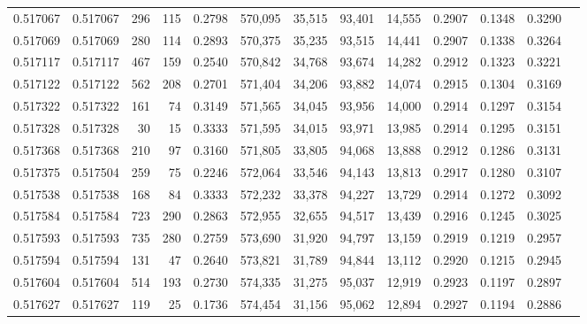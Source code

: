 \begin{tabular}{rrrrrrrrrrrrr}
0.517067 & 0.517067 &   296 &   115 &                                     0.2798 & 570,095 &  35,515 &  93,401 &  14,555 & 0.2907 & 0.1348 & 0.3290 \\
0.517069 & 0.517069 &   280 &   114 &                                     0.2893 & 570,375 &  35,235 &  93,515 &  14,441 & 0.2907 & 0.1338 & 0.3264 \\
0.517117 & 0.517117 &   467 &   159 &                                     0.2540 & 570,842 &  34,768 &  93,674 &  14,282 & 0.2912 & 0.1323 & 0.3221 \\
0.517122 & 0.517122 &   562 &   208 &                                     0.2701 & 571,404 &  34,206 &  93,882 &  14,074 & 0.2915 & 0.1304 & 0.3169 \\
0.517322 & 0.517322 &   161 &    74 &                                     0.3149 & 571,565 &  34,045 &  93,956 &  14,000 & 0.2914 & 0.1297 & 0.3154 \\
0.517328 & 0.517328 &    30 &    15 &                                     0.3333 & 571,595 &  34,015 &  93,971 &  13,985 & 0.2914 & 0.1295 & 0.3151 \\
0.517368 & 0.517368 &   210 &    97 &                                     0.3160 & 571,805 &  33,805 &  94,068 &  13,888 & 0.2912 & 0.1286 & 0.3131 \\
0.517375 & 0.517504 &   259 &    75 &                                     0.2246 & 572,064 &  33,546 &  94,143 &  13,813 & 0.2917 & 0.1280 & 0.3107 \\
0.517538 & 0.517538 &   168 &    84 &                                     0.3333 & 572,232 &  33,378 &  94,227 &  13,729 & 0.2914 & 0.1272 & 0.3092 \\
0.517584 & 0.517584 &   723 &   290 &                                     0.2863 & 572,955 &  32,655 &  94,517 &  13,439 & 0.2916 & 0.1245 & 0.3025 \\
0.517593 & 0.517593 &   735 &   280 &                                     0.2759 & 573,690 &  31,920 &  94,797 &  13,159 & 0.2919 & 0.1219 & 0.2957 \\
0.517594 & 0.517594 &   131 &    47 &                                     0.2640 & 573,821 &  31,789 &  94,844 &  13,112 & 0.2920 & 0.1215 & 0.2945 \\
0.517604 & 0.517604 &   514 &   193 &                                     0.2730 & 574,335 &  31,275 &  95,037 &  12,919 & 0.2923 & 0.1197 & 0.2897 \\
0.517627 & 0.517627 &   119 &    25 &                                     0.1736 & 574,454 &  31,156 &  95,062 &  12,894 & 0.2927 & 0.1194 & 0.2886 \\

\end{tabular}
